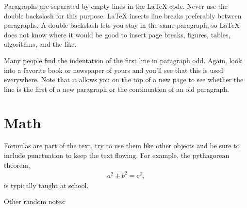 \documentclass[12pt, %
a4paper, %
twoside, %
openright, %
abstract=on, %
DIV=11,      %
BCOR=8mm]{scrbook} %
\begin{document}
    Paragraphs are separated  by empty lines in the  \LaTeX{} code.  Never 
    use  the double  backslash for  this purpose.   \LaTeX{} inserts  line 
    breaks  preferably between  paragraphs.  A  double backslash  lets you 
    stay in the  same paragraph, so \LaTeX{} does not  know where it would 
    be good  to insert page  breaks, figures, tables, algorithms,  and the 
    like.                                                                  

    Many people find  the indentation of the first line  in paragraph odd. 
    Again, look into a favorite book  or newspaper of yours and you'll see 
    that this is used everywhere.  Note that it allows you on the top of a 
    new page to  see whether the line  is the first of a  new paragraph or 
    the continuation of an old paragraph. 

    \section{Math}

    Formulas are part of  the text, try to use them  like other objects and
    be sure to include punctuation to keep the text flowing.  For example,
    the pythagorean theorem,
    \begin{align}
        a^2 + b^2 = c^2,
    \end{align}
    is typically taught at school.

    Other random notes:
\end{document}
